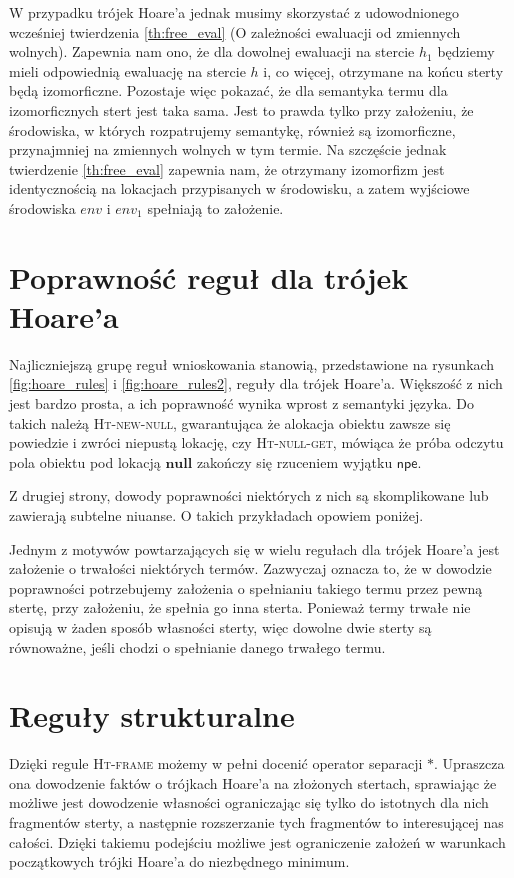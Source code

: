 \documentclass[]{pracamgr}
\renewcommand \| {\hspace{0.75em} | \hspace{0.75em} }
\renewcommand \[ {[\![}
\renewcommand \] {]\!]}
\theoremstyle{definition}
\newcommand{\jnull}{\mathbf{null}\xspace}
\newcommand{\npe}{\mathsf{npe}\xspace}
\begin{document}
W przypadku trójek Hoare'a jednak musimy skorzystać z udowodnionego wcześniej twierdzenia
\ref{th:free_eval} (O zależności ewaluacji od zmiennych wolnych).
Zapewnia nam ono, że dla dowolnej ewaluacji na stercie $h_1$ będziemy mieli odpowiednią
ewaluację na stercie $h$ i, co więcej, otrzymane na końcu sterty będą izomorficzne.
Pozostaje więc pokazać, że dla semantyka termu dla izomorficznych stert jest taka sama.
Jest to prawda tylko przy założeniu, że środowiska, w których rozpatrujemy semantykę,
również są izomorficzne, przynajmniej na zmiennych wolnych w tym termie. Na szczęście jednak
twierdzenie \ref{th:free_eval} zapewnia nam, że otrzymany izomorfizm jest identycznością na
lokacjach przypisanych w środowisku, a zatem wyjściowe środowiska $env$ i $env_1$
spełniają to założenie.


\section{Poprawność reguł dla trójek Hoare'a}
Najliczniejszą grupę reguł wnioskowania stanowią, przedstawione na rysunkach
\ref{fig:hoare_rules} i \ref{fig:hoare_rules2}, reguły dla trójek Hoare'a.
Większość z nich jest bardzo prosta, a ich poprawność wynika wprost z semantyki języka.
Do takich należą \textsc{Ht-new-null}, gwarantująca że alokacja obiektu zawsze się powiedzie i zwróci
niepustą lokację, czy \textsc{Ht-null-get}, mówiąca że próba odczytu pola obiektu pod lokacją
$\jnull$ zakończy się rzuceniem wyjątku $\npe$.

Z drugiej strony, dowody poprawności niektórych z nich są skomplikowane lub zawierają
subtelne niuanse. O takich przykładach opowiem poniżej.

Jednym z motywów powtarzających się w wielu regułach dla trójek Hoare'a
jest założenie o trwałości niektórych termów.
Zazwyczaj oznacza to, że w dowodzie poprawności potrzebujemy założenia o spełnianiu takiego
termu przez pewną stertę, przy założeniu, że spełnia go inna sterta.
Ponieważ termy trwałe nie opisują w żaden sposób własności sterty, więc dowolne dwie sterty
są równoważne, jeśli chodzi o spełnianie danego trwałego termu.

\section{Reguły strukturalne}
Dzięki regule \textsc{Ht-frame} możemy w pełni docenić operator separacji $*$.
Upraszcza ona dowodzenie faktów o trójkach Hoare'a na złożonych stertach,
sprawiając że możliwe jest dowodzenie własności ograniczając się tylko do istotnych
dla nich fragmentów sterty, a następnie rozszerzanie tych fragmentów to
interesującej nas całości. Dzięki takiemu podejściu możliwe jest ograniczenie
założeń w warunkach początkowych trójki Hoare'a do niezbędnego minimum.
\end{document}

